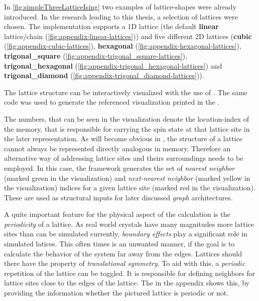 In \autoref{fig:simpleThreeLatticeIsing} two examples of lattice-shapes were already introduced.
In the research leading to this thesis, a selection of lattices were chosen.
The implementation supports a 1D lattice (the default \textbf{linear} lattice/chain  (\autoref{fig:appendix-linear-lattices})) and five different 2D lattices 
(\textbf{cubic} (\autoref{fig:appendix-cubic-lattices}), \textbf{hexagonal} (\autoref{fig:appendix-hexagonal-lattices}), \textbf{trigonal\_square} (\autoref{fig:appendix-trigonal_square-lattices}), \textbf{trigonal\_hexagonal} (\autoref{fig:appendix-trigonal_hexagonal-lattices}) and \textbf{trigonal\_diamond} (\autoref{fig:appendix-trigonal_diamond-lattices})).

The lattice structure can be interactively visualized with the use of \cite{selfDocuments} .
The same code was used to generate the referenced visualization printed in the .

The numbers, that can be seen in the visualization denote the location-index of the memory, that is responsible for carrying the spin state at that lattice site in the later representation. As will become obvious in , the structure of a lattice cannot always be represented directly analogous in memory. Therefore an alternative way of addressing lattice sites and theirs surroundings needs to be employed.
In this case, the framework generates the set of \emph{nearest neighbor} (marked green in the visualization) and \emph{next-nearest neighbor} (marked yellow in the visualization) indices for a given lattice site (marked red in the visualization). These are used as structural inputs for later discussed \emph{graph} architectures.

A quite important feature for the physical aspect of the calculation is the \emph{periodicity} of a lattice. 
As real world crystals have many magnitudes more lattice sites than can be simulated currently, \emph{boundary effects} play a significant role in simulated latices.
This often times is an unwanted manner, if the goal is to calculate the behavior of the system far away from the edges. 
Lattices should there have the property of \emph{translational symmetry}. 
To aid with this, a \emph{periodic} repetition of the lattice can be toggled. 
It is responsible for defining neighbors for lattice sites close to the edges of the lattice.
The  in the appendix shows this, by providing the information whether the pictured lattice is periodic or not.

